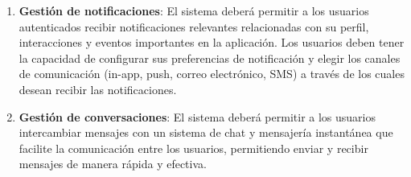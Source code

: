 \begin{enumerate}[label=OBJ-\protect\twodigits{\arabic*}:, align=left, leftmargin=*]
\item \textbf{Gestión de notificaciones}: El sistema deberá permitir a los usuarios autenticados recibir notificaciones relevantes relacionadas con su perfil, interacciones y eventos importantes en la aplicación. Los usuarios deben tener la capacidad de configurar sus preferencias de notificación y elegir los canales de comunicación (in-app, push, correo electrónico, SMS) a través de los cuales desean recibir las notificaciones.

\item \textbf{Gestión de conversaciones}: El sistema deberá permitir a los usuarios intercambiar mensajes con un sistema de chat y mensajería instantánea que facilite la comunicación entre los usuarios, permitiendo enviar y recibir mensajes de manera rápida y efectiva.

\end{enumerate}